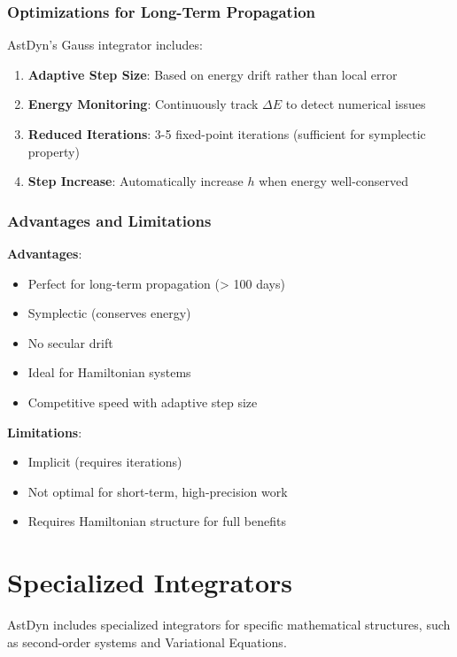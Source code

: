 \subsubsection{Optimizations for Long-Term Propagation}

AstDyn's Gauss integrator includes:

\begin{enumerate}
    \item \textbf{Adaptive Step Size}: Based on energy drift rather than local error
    \item \textbf{Energy Monitoring}: Continuously track $\Delta E$ to detect numerical issues
    \item \textbf{Reduced Iterations}: 3-5 fixed-point iterations (sufficient for symplectic property)
    \item \textbf{Step Increase}: Automatically increase $h$ when energy well-conserved
\end{enumerate}

\subsubsection{Advantages and Limitations}

\textbf{Advantages}:
\begin{itemize}
    \item Perfect for long-term propagation (> 100 days)
    \item Symplectic (conserves energy)
    \item No secular drift
    \item Ideal for Hamiltonian systems
    \item Competitive speed with adaptive step size
\end{itemize}

\textbf{Limitations}:
\begin{itemize}
    \item Implicit (requires iterations)
    \item Not optimal for short-term, high-precision work
    \item Requires Hamiltonian structure for full benefits
\end{itemize}

\section{Specialized Integrators}

AstDyn includes specialized integrators for specific mathematical structures, such as second-order systems and Variational Equations.

